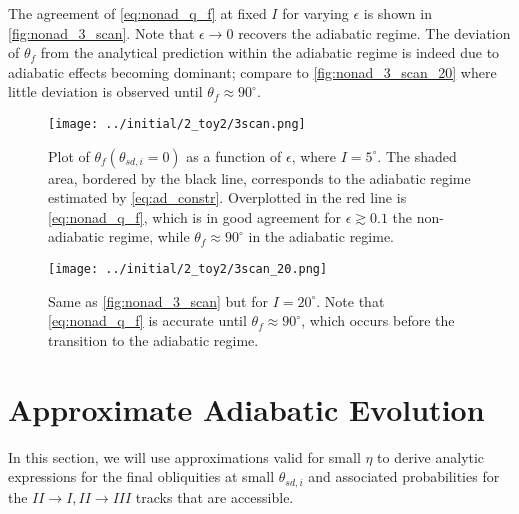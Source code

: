 \documentclass[
        fleqn,
        usenatbib,
    ]{mnras}
\newcommand*{\p}[1]{\left(#1\right)}
\begin{document}
The agreement of \autoref{eq:nonad_q_f} at fixed $I$ for varying $\epsilon$ is
shown in \autoref{fig:nonad_3_scan}. Note that $\epsilon \to 0$ recovers the
adiabatic regime. The deviation of $\theta_f$ from the analytical prediction
within the adiabatic regime is indeed due to adiabatic effects becoming
dominant; compare to \autoref{fig:nonad_3_scan_20} where little deviation is
observed until $\theta_f \approx 90^\circ$.
\begin{figure}
    \centering
    \texttt{[image: ../initial/2\_toy2/3scan.png]}
    \caption{Plot of $\theta_{ f}\p{\theta_{sd, i} = 0}$ as a function of
    $\epsilon$, where $I = 5^\circ$. The shaded area, bordered by the black
    line, corresponds to the adiabatic regime estimated by
    \autoref{eq:ad_constr}. Overplotted in the red line is
    \autoref{eq:nonad_q_f}, which is in good agreement for $\epsilon \gtrsim
    0.1$ the non-adiabatic regime, while $\theta_{f} \approx 90^\circ$ in the
    adiabatic regime.}\label{fig:nonad_3_scan}
\end{figure}
\begin{figure}
    \centering
    \texttt{[image: ../initial/2\_toy2/3scan\_20.png]}
    \caption{Same as \autoref{fig:nonad_3_scan} but for $I=20^\circ$. Note that
    \autoref{eq:nonad_q_f} is accurate until $\theta_f \approx 90^\circ$, which
    occurs before the transition to the adiabatic
    regime.}\label{fig:nonad_3_scan_20}
\end{figure}




\appendix

\section{Approximate Adiabatic Evolution}\label{s:app_transition}

In this section, we will use approximations valid for small $\eta$ to derive
analytic expressions for the final obliquities at small $\theta_{sd, i}$ and
associated probabilities for the $II \to I, II \to III$ tracks that are
accessible.
\end{document}
